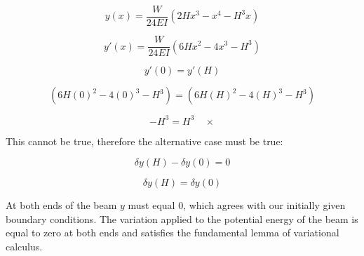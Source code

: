 \documentclass[../main.tex]{subfiles}
\begin{document}
\[
    y(x) =  \frac{W}{24EI} \left({2Hx^3 - x^4 - H^3 x}\right)
\]

\[
    y'(x) =  \frac{W}{24EI} \left({6Hx^2 - 4x^3 - H^3}\right)
\]

\[
    y'(0) = y'(H)
\]

\[
    \left({6H(0)^2 - 4(0)^3 - H^3}\right) = \left({6H(H)^2 - 4(H)^3 - H^3}\right)
\]

\[
    -H^3 = H^3 \quad \times
\]

This cannot be true, therefore the alternative case must be true:

\[
    \delta y(H) - \delta y (0) = 0
\]

\[
    \delta y(H) = \delta y (0)
\]

At both ends of the beam \(y\) must equal 0, which agrees with our initially given boundary conditions. 
The variation applied to the potential energy of the beam is equal to zero at both ends and satisfies the fundamental lemma of variational calculus.
\end{document}
